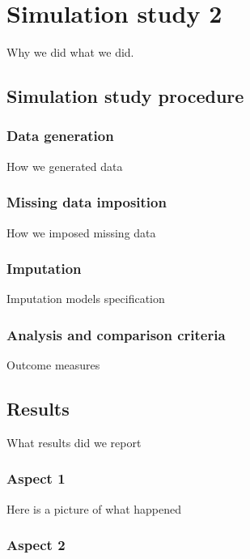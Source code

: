 \documentclass[a4paper,doc,floatsintext,natbib]{apa6}\usepackage[]{graphicx}\usepackage[]{xcolor}
\begin{document}
    
\section{Simulation study 2}

	Why we did what we did.

\subsection{Simulation study procedure}

\subsubsection{Data generation}

	How we generated data	

\subsubsection{Missing data imposition}\label{sub-missing}

	How we imposed missing data	

\subsubsection{Imputation}

	Imputation models specification

\subsubsection{Analysis and comparison criteria}\label{criteria}

	Outcome measures

\subsection{Results}
	
	What results did we report

\subsubsection{Aspect 1}

	Here is a picture of what happened

\subsubsection{Aspect 2}
\end{document}
